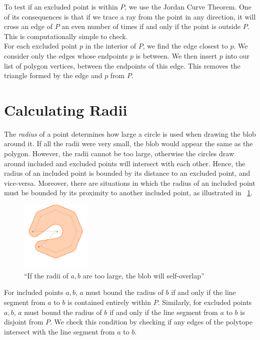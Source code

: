 \documentclass[paper=a4, fontsize=11pt]{scrartcl} %
\numberwithin{equation}{section} %
\numberwithin{figure}{section} %
\numberwithin{table}{section} %
\begin{document}
To test if an excluded point is within $P$, we use the Jordan Curve Theorem. One
of its consequences is that if we trace a ray from the point in any direction,
it will cross an edge of $P$ an even number of times if and only if the point is
outside $P$.  This is computationally simple to check. \\

For each excluded point $p$ in the interior of $P$, we find the edge closest to
$p$. We consider only the edges whose endpoints $p$ is between.  We then insert
$p$ into our list of polygon vertices, between the endpoints of this edge. This
removes the triangle formed by the edge and $p$ from $P$.


\section{Calculating Radii}
The \textit{radius} of a point determines how large a circle is used when
drawing the blob around it. If all the radii were very small, the blob would
appear the same as the polygon.  However, the radii cannot be too large,
otherwise the circles draw around included and excluded points will intersect
with each other. Hence, the radius of an included point is bounded by its
distance to an excluded point, and vice-versa. Moreover, there are situations in
which the radius of an included point must be bounded by its proximity to
another included point, as illustrated in ~\ref{fig:neck}.

\begin{figure}[h]
\includegraphics[width=0.3\textwidth]{torus_bitten}
\centering
\caption{``If the radii of $a,b$ are too large, the blob will self-overlap''}
\label{fig:neck}
\end{figure}

For included points $a,b$, $a$ must bound the radius of $b$ if and only if the
line segment from $a$ to $b$ is contained entirely within $P$. Similarly, for
excluded points $a,b$, $a$ must bound the radius of $b$ if and only if the line
segment from $a$ to $b$ is disjoint from $P$. We check this condition by
checking if any edges of the polytope intersect with the line segment from $a$
to $b$. \\
\end{document}
